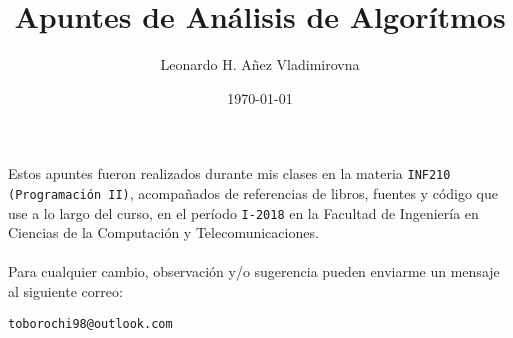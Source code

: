 

\title{Apuntes de Análisis de Algorítmos}

\author{Leonardo H. Añez Vladimirovna}
\date{\today}

\maketitle

Estos apuntes fueron realizados durante mis clases en la materia \texttt{INF210 (Programación II)}, acompañados de referencias de libros, fuentes y código que use a lo largo del curso, en el período \texttt{I-2018} en la Facultad de Ingeniería en Ciencias de la Computación y Telecomunicaciones. 
\\ \vspace{0.5cm} \\
Para cualquier cambio, observación y/o sugerencia pueden enviarme un mensaje al siguiente correo:
\begin{center}
 \texttt{toborochi98@outlook.com}
\end{center}
